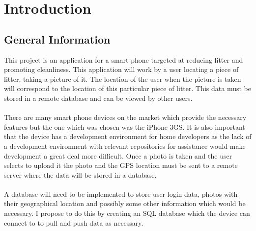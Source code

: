 \documentclass{article}
\begin{document}
\newpage



\label{sec:Subsection}

\section{Introduction}


\subsection{General Information}

This project is an application for a smart phone targeted at reducing litter and promoting cleanliness. This application will work by a user locating a piece of litter, taking a picture of it. The location of the user when the picture is taken will correspond to the location of this particular piece of litter. This data must be stored in a remote database and can be viewed by other users.

\paragraph{}
\label{par:Second Paragraph}


There are many smart phone devices on the market which provide the necessary features but the one which was chosen was the iPhone 3GS.
It is also important that the device has a development environment for home developers as the lack of a development environment with relevant repositories for assistance would make development a great deal more difficult.
Once a photo is taken and the user selects to upload it the photo and the GPS location must be sent to a remote server where the data will be stored in a database.

\paragraph{}
\label{par:Second Paragraph}

A database will need to be implemented to store user login data, photos with their geographical location and possibly some other information which would be necessary. I propose to do this by creating an SQL database which the device can connect to to pull and push data as necessary.

\paragraph{}
\label{par:website}
\end{document}
